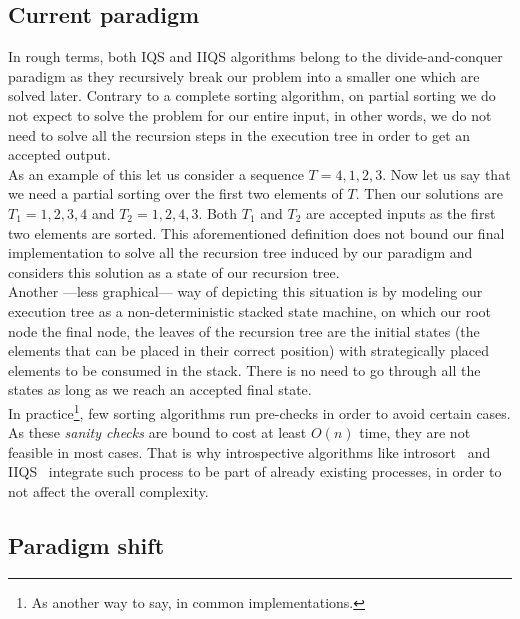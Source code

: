 \subsection{Current paradigm}
In rough terms, both IQS and IIQS algorithms belong to the divide-and-conquer paradigm as they recursively break our problem into a smaller one which are solved later. Contrary to a complete sorting algorithm, on partial sorting we do not expect to solve the problem for our entire input, in other words, we do not need to solve all the recursion steps in the execution tree in order to get an accepted output. \\

As an example of this let us consider a sequence $T={4,1,2,3}$. Now let us say that we need a partial sorting over the first two elements of $T$. Then our solutions are $T_1={1,2,3,4}$ and $T_2={1,2,4,3}$. Both $T_1$ and $T_2$ are accepted inputs as the first two elements are sorted. This aforementioned definition does not bound our final implementation to solve all the recursion tree induced by our paradigm and considers this solution as a state of our recursion tree. \\

Another ---less graphical--- way of depicting this situation is by modeling our execution tree as a non-deterministic stacked state machine, on which our root node the final node, the leaves of the recursion tree are the initial states (the elements that can be placed in their correct position) with strategically placed elements to be consumed in the stack. There is no need to go through all the states as long as we reach an accepted final state.\\


In practice\footnote{As another way to say, in common implementations.}, few sorting algorithms run pre-checks in order to avoid certain cases. As these \emph{sanity checks} are bound to cost at least $O(n)$ time, they are not feasible in most cases. That is why introspective algorithms like introsort~\cite{MusserIntroSort} and IIQS~\cite{7416566} integrate such process to be part of already existing processes, in order to not affect the overall complexity. \\

\subsection{Paradigm shift}

